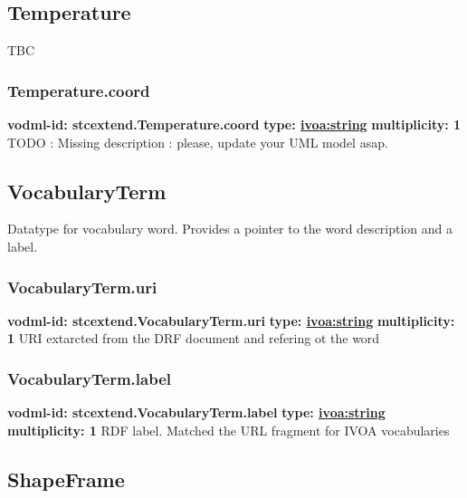   \subsection{Temperature}
  \label{sect:stcextend.Temperature}
    TBC

    \subsubsection{Temperature.coord}
      \textbf{vodml-id: stcextend.Temperature.coord} \newline
      \textbf{type: \hyperref[sect:ivoa]{ivoa:string}} \newline
      \textbf{multiplicity: 1} \newline 
      TODO : Missing description : please, update your UML model asap.

  \subsection{VocabularyTerm}
  \label{sect:stcextend.VocabularyTerm}
    Datatype for vocabulary word. Provides a pointer to the word description and a label.

    \subsubsection{VocabularyTerm.uri}
      \textbf{vodml-id: stcextend.VocabularyTerm.uri} \newline
      \textbf{type: \hyperref[sect:ivoa]{ivoa:string}} \newline
      \textbf{multiplicity: 1} \newline 
      URI extarcted from the DRF document and refering ot the word

    \subsubsection{VocabularyTerm.label}
      \textbf{vodml-id: stcextend.VocabularyTerm.label} \newline
      \textbf{type: \hyperref[sect:ivoa]{ivoa:string}} \newline
      \textbf{multiplicity: 1} \newline 
      RDF label. Matched the URL fragment for IVOA vocabularies

  \subsection{ShapeFrame}
  \label{sect:stcextend.ShapeFrame}

